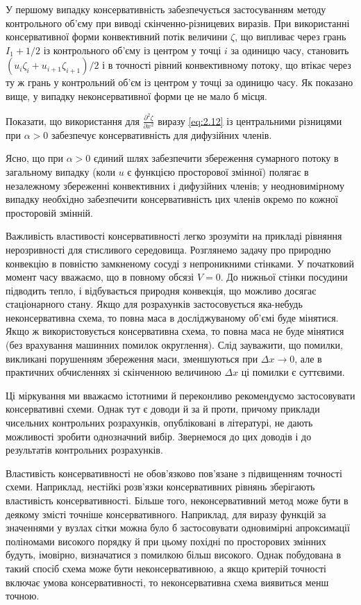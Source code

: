У першому випадку консервативність забезпечується застосуванням методу контрольного об'єму при виводі скінченно-різницевих виразів. При використанні консервативної форми конвективний потік величини $\zeta$, що випливає через грань $I_1 + 1/2$ із контрольного об'єму із центром у точці $i$ за одиницю часу, становить $(u_i\zeta_i+u_{i+1}\zeta_{i+1})/2$ і в точності рівний конвективному потоку, що втікає через ту ж грань у контрольний об'єм із центром у точці  за одиницю часу. Як показано вище, у випадку неконсервативної форми це не мало б місця.

\begin{exercise}
    Показати, що використання для $\frac{\partial^2 \zeta}{\partial x^2}$ виразу \eqref{eq:2.12} із центральними різницями при $\alpha > 0$ забезпечує консервативність для дифузійних членів.
\end{exercise}

Ясно, що при $\alpha > 0$ єдиний шлях забезпечити збереження сумарного потоку в загальному випадку (коли $u$ є функцією просторової змінної) полягає в незалежному збереженні конвективних і дифузійних членів; у неодновимірному випадку необхідно забезпечити консервативність цих членів окремо по кожної просторовій змінній. \medskip

Важливість властивості консервативності легко зрозуміти на прикладі рівняння нерозривності для стисливого середовища. Розглянемо задачу про природню конвекцію в повністю замкненому сосуді з непроникними стінками. У початковий момент часу вважаємо, що в повному обсязі $V = 0$. До нижньої стінки посудини підводить тепло, і відбувається природня конвекція, що можливо досягає стаціонарного стану. Якщо для розрахунків застосовується яка-небудь неконсервативна схема, то повна маса в досліджуваному об'ємі буде мінятися. Якщо ж використовується консервативна схема, то повна маса не буде мінятися (без врахування машинних помилок округлення). Слід зауважити, що помилки, викликані порушенням збереження маси, зменшуються при $\Delta x \to 0$, але в практичних обчисленнях зі скінченною величиною $\Delta x$ ці помилки є суттєвими. \medskip

Ці міркування ми вважаємо істотними й переконливо рекомендуємо застосовувати консервативні схеми. Однак тут є доводи й за й проти, причому приклади чисельних контрольних розрахунків, опубліковані в літературі, не дають можливості зробити однозначний вибір. Звернемося до цих доводів і до результатів контрольних розрахунків. \medskip

Властивість консервативності не обов'язково пов'язане з підвищенням точності схеми. Наприклад, нестійкі розв'язки консервативних рівнянь зберігають властивість консервативності. Більше того, неконсервативний метод може бути в деякому змісті точніше консервативного. Наприклад, для виразу функцій за значеннями у вузлах сітки можна було б застосовувати одновимірні апроксимації поліномами високого порядку й при цьому похідні по просторових змінних будуть, імовірно, визначатися з помилкою більш високого. Однак побудована в такий спосіб схема може бути неконсервативною, а якщо критерій точності включає умова консервативності, то неконсервативна схема виявиться менш точною. \medskip

